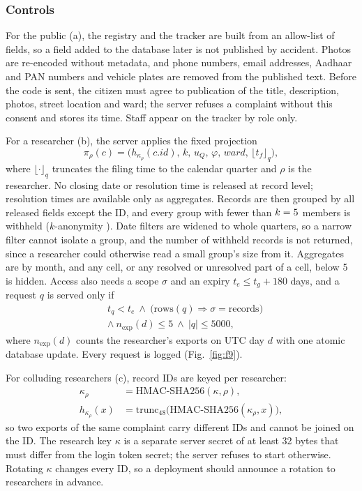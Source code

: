 \documentclass{ieeeaccess}
\begin{document}
\subsubsection{Controls}
For the public (a), the registry and the tracker are built from an allow-list of fields, so a field added to the database later is not published by accident. Photos are re-encoded without metadata, and phone numbers, email addresses, Aadhaar and PAN numbers and vehicle plates are removed from the published text. Before the code is sent, the citizen must agree to publication of the title, description, photos, street location and ward; the server refuses a complaint without this consent and stores its time. Staff appear on the tracker by role only.

For a researcher (b), the server applies the fixed projection
\begin{equation}
\pi_\rho(c)=\bigl(h_{\kappa_\rho}(c.\mathit{id}),\,k,\,u_Q,\,\varphi,\,\mathit{ward},\,\lfloor t_f\rfloor_{q}\bigr),
\label{eq:proj}
\end{equation}
where $\lfloor\cdot\rfloor_q$ truncates the filing time to the calendar quarter and $\rho$ is the researcher. No closing date or resolution time is released at record level; resolution times are available only as aggregates. Records are then grouped by all released fields except the ID, and every group with fewer than $k=5$ members is withheld ($k$-anonymity \cite{b37}). Date filters are widened to whole quarters, so a narrow filter cannot isolate a group, and the number of withheld records is not returned, since a researcher could otherwise read a small group's size from it. Aggregates are by month, and any cell, or any resolved or unresolved part of a cell, below 5 is hidden. Access also needs a scope $\sigma$ and an expiry $t_e\le t_g+180$ days, and a request $q$ is served only if
\begin{equation}
\begin{aligned}
&t_q<t_e\ \wedge\ \bigl(\mathrm{rows}(q)\Rightarrow\sigma=\mathrm{records}\bigr)\\
&\wedge\ n_{\mathrm{exp}}(d)\le5\ \wedge\ |q|\le5000,
\end{aligned}
\label{eq:access}
\end{equation}
where $n_{\mathrm{exp}}(d)$ counts the researcher's exports on UTC day $d$ with one atomic database update. Every request is logged (Fig.~\ref{fig:f9}).

For colluding researchers (c), record IDs are keyed per researcher:
\begin{equation}
\begin{aligned}
\kappa_\rho&=\mathrm{HMAC\text{-}SHA256}(\kappa,\rho),\\
h_{\kappa_\rho}(x)&=\mathrm{trunc}_{48}\bigl(\mathrm{HMAC\text{-}SHA256}(\kappa_\rho,x)\bigr),
\end{aligned}
\label{eq:hmac}
\end{equation}
so two exports of the same complaint carry different IDs and cannot be joined on the ID. The research key $\kappa$ is a separate server secret of at least 32 bytes that must differ from the login token secret; the server refuses to start otherwise. Rotating $\kappa$ changes every ID, so a deployment should announce a rotation to researchers in advance.
\end{document}
